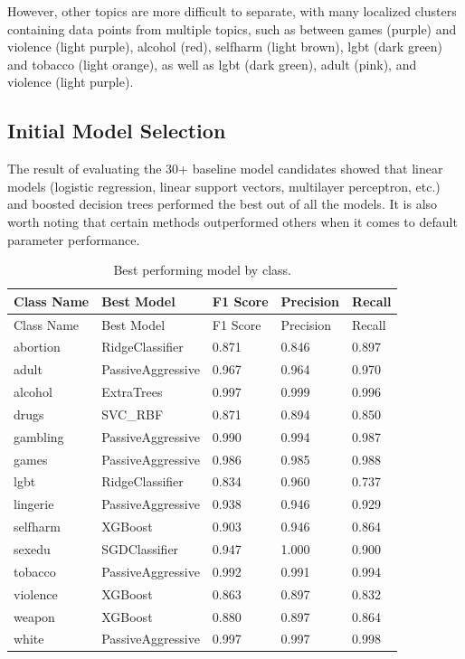 \documentclass[
  titlepage]{article}
\begin{document}
However, other topics are more difficult to separate, with many
localized clusters containing data points from multiple topics, such as
between games (purple) and violence (light purple), alcohol (red),
selfharm (light brown), lgbt (dark green) and tobacco (light orange), as
well as lgbt (dark green), adult (pink), and violence (light purple).

\subsection{Initial Model Selection}\label{initial-model-selection}

The result of evaluating the 30+ baseline model candidates showed that
linear models (logistic regression, linear support vectors, multilayer
perceptron, etc.) and boosted decision trees performed the best out of
all the models. It is also worth noting that certain methods
outperformed others when it comes to default parameter performance.

\begin{longtable}[]{@{}lllll@{}}
\caption{Best performing model by class.}\tabularnewline
\toprule\noalign{}
Class Name & Best Model & F1 Score & Precision & Recall \\
\midrule\noalign{}
\endfirsthead
\toprule\noalign{}
Class Name & Best Model & F1 Score & Precision & Recall \\
\midrule\noalign{}
\endhead
\bottomrule\noalign{}
\endlastfoot
abortion & RidgeClassifier & 0.871 & 0.846 & 0.897 \\
adult & PassiveAggressive & 0.967 & 0.964 & 0.970 \\
alcohol & ExtraTrees & 0.997 & 0.999 & 0.996 \\
drugs & SVC\_RBF & 0.871 & 0.894 & 0.850 \\
gambling & PassiveAggressive & 0.990 & 0.994 & 0.987 \\
games & PassiveAggressive & 0.986 & 0.985 & 0.988 \\
lgbt & RidgeClassifier & 0.834 & 0.960 & 0.737 \\
lingerie & PassiveAggressive & 0.938 & 0.946 & 0.929 \\
selfharm & XGBoost & 0.903 & 0.946 & 0.864 \\
sexedu & SGDClassifier & 0.947 & 1.000 & 0.900 \\
tobacco & PassiveAggressive & 0.992 & 0.991 & 0.994 \\
violence & XGBoost & 0.863 & 0.897 & 0.832 \\
weapon & XGBoost & 0.880 & 0.897 & 0.864 \\
white & PassiveAggressive & 0.997 & 0.997 & 0.998 \\
\end{longtable}
\end{document}
